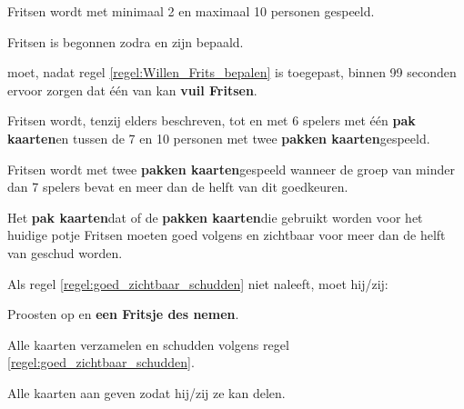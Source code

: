 \newpage
{}
\label{sec:beginfase_start}


\vervolgLijst{}
    \item Fritsen wordt met minimaal 2 en maximaal 10 personen gespeeld.
\eindLijst{}

\vervolgLijst{}
    \item Fritsen is begonnen zodra \Frits en \Willem zijn bepaald.
    \label{regel:Willen_Frits_bepalen}
\eindLijst{}

\vervolgLijst{}
    \item \Frits moet, nadat regel \ref{regel:Willen_Frits_bepalen} is toegepast, binnen 99 seconden ervoor zorgen dat één van \alleSpelers kan \textbf{vuil Fritsen}.
\eindLijst{}


\vervolgLijst{}
    \item Fritsen wordt, tenzij elders beschreven, tot en met 6 spelers met één \textbf{pak kaarten}\footnotemark[1] en tussen de 7 en 10 personen met twee \textbf{pakken kaarten}\footnotemark[1] gespeeld.
\eindLijst{}

\vervolgLijst{}
    \item Fritsen wordt met twee \textbf{pakken kaarten}\footnotemark[1] gespeeld wanneer de groep van \alleSpelers minder dan 7 spelers bevat en meer dan de helft van \alleSpelers dit goedkeuren. 
\eindLijst{}

\vervolgLijst{}
    \item Het \textbf{pak kaarten}\footnotemark[1] dat of de \textbf{pakken kaarten}\footnotemark[1] die gebruikt worden voor het huidige potje Fritsen moeten goed volgens en zichtbaar voor meer dan de helft van \alleSpelers geschud worden.
    \label{regel:goed_zichtbaar_schudden}
\eindLijst{}

\vervolgLijst{}
    \item Als \eenSpeler regel \ref{regel:goed_zichtbaar_schudden} niet naleeft, moet hij/zij:
    \puntLijst{}
        \item Proosten op  en \textbf{een Fritsje des nemen}\footnotemark[2].
        \item Alle kaarten verzamelen en schudden volgens regel \ref{regel:goed_zichtbaar_schudden}.
        \item Alle kaarten aan \Frits geven zodat hij/zij ze kan delen.
    \eindPuntLijst{}
\eindLijst{}

